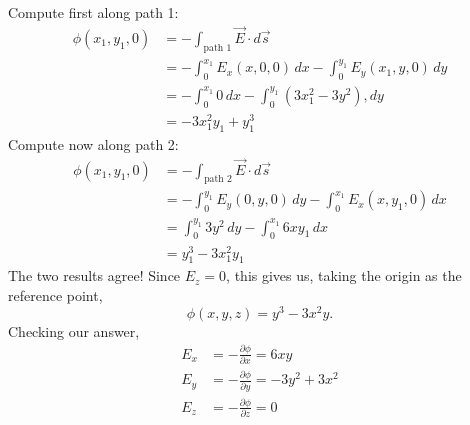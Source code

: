 \documentclass[solutions]{esg8022pset}
\begin{document}
  Compute first along path 1:
  \begin{align*}
    \phi(x_1, y_1, 0) & = -\int_{\text{path 1}} \vec E \cdot d\vec s \\
      & = -\int_0^{x_1} E_x(x, 0, 0)\,dx - \int_0^{y_1} E_y(x_1, y, 0)\,dy \\
      & = -\int_0^{x_1} 0\,dx - \int_0^{y_1} (3x_1^2 - 3y^2),dy \\
      & = -3x_1^2 y_1 + y_1^3
  \end{align*}
  Compute now along path 2:
  \begin{align*}
    \phi(x_1, y_1, 0) & = -\int_{\text{path 2}} \vec E \cdot d\vec s \\
      & = -\int_0^{y_1} E_y(0, y, 0)\,dy - \int_0^{x_1} E_x(x, y_1, 0)\,dx \\
      & = \int_0^{y_1} 3y^2\,dy - \int_0^{x_1}6xy_1\,dx \\
      & = y_1^3 - 3x_1^2y_1
  \end{align*}
  The two results agree!  Since $E_z = 0$, this gives us, taking the origin as the reference point,
  $$\phi(x, y, z) = y^3 - 3x^2 y.$$
  Checking our answer,
  \begin{align*}
    E_x & = -\frac{\partial \phi}{\partial x} = 6xy \\
    E_y & = -\frac{\partial \phi}{\partial y} = -3y^2 + 3x^2 \\
    E_z & = -\frac{\partial \phi}{\partial z} = 0
  \end{align*}
\end{document}
